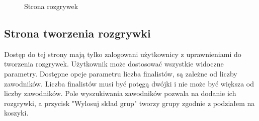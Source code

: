 \documentclass[shortabstract]{iithesis}
\begin{document}
\begin{figure}[H]
    \centering
    \hfill
    \caption{Strona rozgrywek}
\end{figure}

\subsection{Strona tworzenia rozgrywki}
Dostęp do tej strony mają tylko zalogowani użytkownicy z uprawnieniami do tworzenia rozgrywek.
Użytkownik może dostosować wszystkie widoczne parametry. Dostępne opcje parametru liczba finalistów, są zależne od liczby zawodników.
Liczba finalistów musi być potęgą dwójki i nie może być większa od liczby zawodników.
Pole wyszukiwania zawodników pozwala na dodanie ich rozgrywki, a przycisk "Wylosuj skład grup" tworzy grupy zgodnie z podziałem na koszyki.
\end{document}
